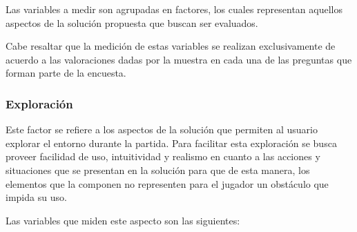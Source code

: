 Las variables a medir son agrupadas en
factores, los cuales representan aquellos aspectos de la solución propuesta que
buscan ser evaluados.

Cabe resaltar que la medición de estas variables se realizan
exclusivamente de acuerdo a las valoraciones dadas por la muestra en cada una de
las preguntas que forman parte de la encuesta.

\subsubsection{Exploración}
\label{sec:sub_exploracion}
%

Este factor se refiere a los aspectos de la solución que permiten al usuario 
explorar el entorno durante la partida. Para facilitar esta exploración se 
busca proveer  facilidad de uso, intuitividad y realismo en cuanto a las acciones y
situaciones que se presentan en la solución para que de esta manera, los
elementos que la componen no representen para el jugador un obstáculo que impida
su uso.


Las variables que miden este aspecto son las siguientes:

